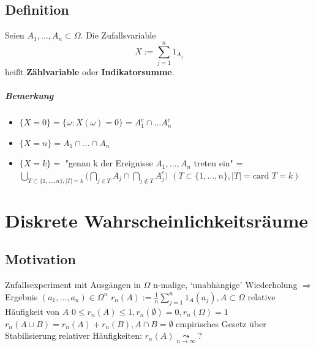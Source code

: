 \documentclass[a4paper,11pt,notitlepage]{report}
\begin{document}
\section{Definition}
Seien $A_1, \ldots, A_n \subset \Omega$. Die Zufallsvariable 
$$X := \sum\limits_{j=1}^{n}{1_{A_j}}$$ heißt \textbf{Zählvariable} oder \textbf{Indikatorsumme}.

\paragraph{Bemerkung}
\begin{itemize}
	\item $\{X=0\} = \{\omega \colon X(\omega) = 0 \} = A_{1}^c \cap \ldots A_{n}^c$
	\item $\{X = n \} = A_1 \cap \ldots \cap A_n$
	\item $\{X = k\} = $ "genau k der Ereignisse $A_1, \ldots, A_n$ treten ein" = $\bigcup\limits_{T \subset \{1, \ldots, n\}, |T|=k}{\bigl (\bigcap\limits_{j \in T}{A_j} \cap \bigcap\limits_{j \notin T}{A_{j}^c} \bigr )}$ \newline
$(T \subset \{1, \ldots, n\}, |T| = \text{card } T = k)$
\end{itemize}

\chapter{Diskrete Wahrscheinlichkeitsräume}

\section{Motivation}
Zufallsexperiment mit Ausgängen in $\Omega$
\newline
n-malige, `unabhängige' Wiederholung
\newline
$\Rightarrow$ Ergebnis $(a_1, \ldots, a_n) \in \Omega^n$
\newline
$r_n(A):= \frac{1}{n} \sum\limits_{j=1}^{n}{1_A(a_j)}, A \subset \Omega$ relative Häufigkeit von $A$
\newline
$0 \leq r_n(A) \leq 1, r_n(\emptyset) = 0, r_n(\Omega) = 1$
\newline
$r_n(A \cup B) = r_n(A) + r_n(B), A \cap B = \emptyset$
\newline
empirisches Gesetz über Stabilisierung relativer Häufigkeiten:
\newline
$r_n(A) \underset{n \rightarrow \infty}{\leadsto} ? $
\end{document}

